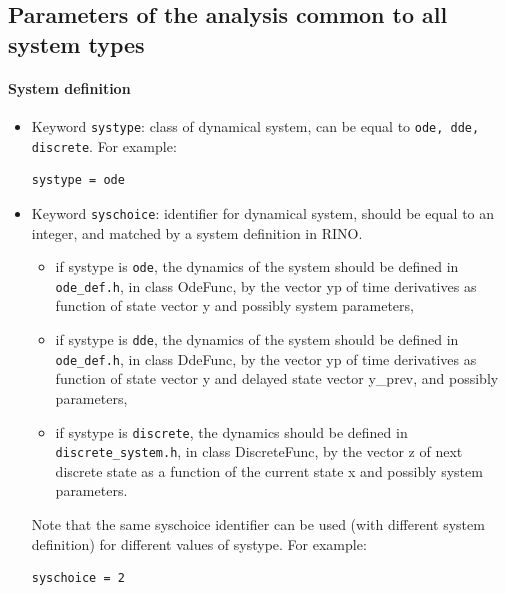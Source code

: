 \documentclass{article}
\begin{document}
\subsection{Parameters of the analysis common to all system types}

\paragraph{System definition}
\begin{itemize}
\item Keyword \texttt{systype}: class of dynamical system, can be equal to \texttt{ode, dde, discrete}.  For example:
\begin{verbatim}
systype = ode
\end{verbatim}

\item Keyword \texttt{syschoice}: identifier for dynamical system,  should be equal to an integer, and matched by a system definition in RINO.
\begin{itemize}
\item if systype is \texttt{ode}, the dynamics of the system should be defined in   \texttt{ode\_def.h}, in class OdeFunc,  by the vector yp  of time derivatives as function of state vector y and possibly system parameters, 
\item if systype is \texttt{dde}, the dynamics of the system should be defined in   \texttt{ode\_def.h}, in class DdeFunc,  by the vector yp  of time derivatives as function of state vector y and delayed state vector y\_prev,  and possibly parameters,
\item if systype is \texttt{discrete},  the dynamics should be defined in \texttt{discrete\_system.h}, in class DiscreteFunc, by the vector z of next discrete state as a function of the current state x and possibly system parameters. 
\end{itemize}
Note that the same syschoice identifier can be used (with different system definition) for different values of systype.  
For example:
\begin{verbatim}
syschoice = 2
\end{verbatim}
\end{itemize}
\end{document}
